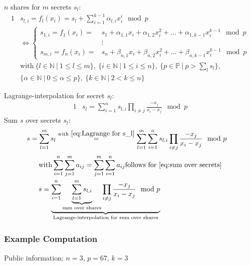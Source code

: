 		$n$ shares for $m$ secrets $s_l$:
		\begin{alignat}{1}
			&s_{l,i} = f_l(x_i) = s_l + \sum_{i=1}^{k-1} \alpha_{l,i} x_i^i \mod p \\
			& \Leftrightarrow \begin{cases}
				s_{1,i} = f_1(x_i) = & s_1 + \alpha_{1,1} x_i + \alpha_{1,2} x_i^2 + ... + \alpha_{1,k-1}x_i^{k-1} \mod p \\
				&\vdots \\
				s_{m,i} = f_n(x_i) = & s_n + \beta_{n,1} x_i + \beta_{n,2} x_i^2 + ... + \beta_{n,k-1}x_i^{k-1} \mod p
			  \end{cases} \nonumber \\
			& \text{with} \ \{l \in \mathbb{N} \ | \ 1 \leq l \leq m \},
			\ \{i \in \mathbb{N} \ | \ 1 \leq i \leq n \},
			\ \{ p \in \mathbb{P} \ | \ p > \sum_l s_l \}, \nonumber \\
			&\{ \alpha \in \mathbb{N} \ | \ 0 \leq \alpha \leq p \},
			\ \{k \in \mathbb{N} \ | \ 2 < k \leq n \} \nonumber
		\end{alignat}
		
		Lagrange-interpolation for secret $s_l$:
		\begin{alignat}{1}
			&s_l = \sum_{i=1}^{n}s_{l,i}\prod_{i\neq j}\frac{-x_j}{x_i - x_j} \mod p \label{eq:Lagrange for s_l}
		\end{alignat}
		Sum $s$ over secrets $s_l$:
		\begin{alignat}{1}
			&s = \sum_{l=1}^{m} s_l \overset{\text{with} \ \ref{eq:Lagrange for s_l}}{=} \sum_{l=1}^{m} \sum_{i=1}^{n} s_{l,i}\prod_{i\neq j} \frac{-x_j}{x_i-x_j} \mod p \label{eq:sum over secrets}
		\end{alignat}
		\begin{alignat}{1}
		&\text{with} \sum_{i=1}^{n}\sum_{j=1}^{m}a_{ij} = \sum_{j=1}^{m}\sum_{i=1}^{n}a_{ij} \text{follows for \ref{eq:sum over secrets}} \nonumber\\
		&s= \underbrace{ \sum_{i=1}^n \underbrace{\sum_{l=1}^{m} s_{l,i}}_{\text{sum over shares}} \prod_{i\neq j} \frac{-x_j}{x_i-x_j} \mod p }_{\text{Lagrange-interpolation for sum over shares}}
		\end{alignat}	
		
		\subsubsection*{Example Computation}
		Public information: $n=3$, $p=67$, $k=3$\par
		
